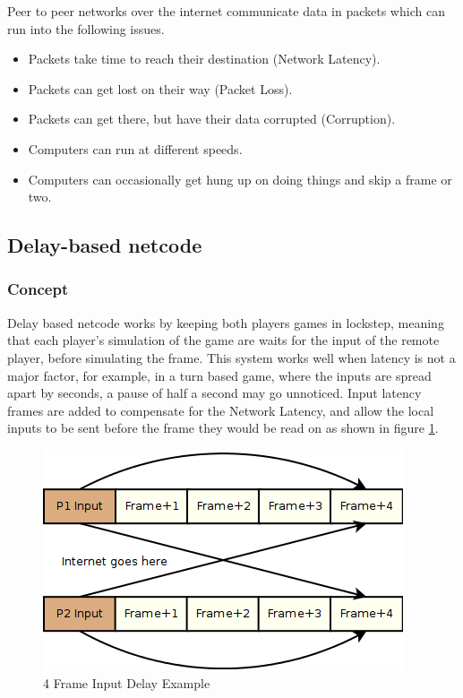 \documentclass{entcs}
\begin{document}
Peer to peer networks over the internet communicate data in packets which can run into the following issues.
\begin{itemize}
\item{Packets take time to reach their destination (Network Latency).}
\item{Packets can get lost on their way (Packet Loss).}
\item{Packets can get there, but have their data corrupted (Corruption).}
\item{Computers can run at different speeds.}
\item{Computers can occasionally get hung up on doing things and skip a frame or two.}
\end{itemize}

\subsection{Delay-based netcode}
\subsubsection{Concept}
Delay based netcode works by keeping both players games in lockstep, meaning that each player's simulation of the game are waits for the input of the remote player, before simulating the frame\cite{DelayBasedNetcode}. This system works well when latency is not a major factor, for example, in a turn based game, where the inputs are spread apart by seconds, a pause of half a second may go unnoticed.
Input latency frames are added to compensate for the Network Latency, and allow the local inputs to be sent before the frame they would be read on as shown in figure \ref{fig:InputLatencyEffect}.

\begin{figure}[h]
\centering
\includegraphics{InputDelay}
\caption{4 Frame Input Delay Example \cite{FightingGameNetworking}}
\label{fig:InputLatencyEffect}
\end{figure}
\end{document}
